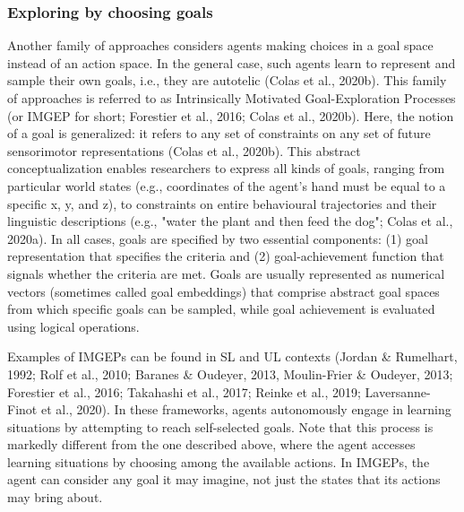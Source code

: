\subsubsection{Exploring by choosing goals}
Another family of approaches considers agents making choices in a goal space instead of an action space. In the general case, such agents learn to represent and sample their own goals, i.e., they are autotelic (Colas et al., 2020b). This family of approaches is referred to as Intrinsically Motivated Goal-Exploration Processes (or IMGEP for short; Forestier et al., 2016; Colas et al., 2020b). Here, the notion of a goal is generalized: it refers to any set of constraints on any set of future sensorimotor representations (Colas et al., 2020b). This abstract conceptualization enables researchers to express all kinds of goals, ranging from particular world states (e.g., coordinates of the agent’s hand must be equal to a specific x, y, and z), to constraints on entire behavioural trajectories and their linguistic descriptions (e.g., "water the plant and then feed the dog"; Colas et al., 2020a). In all cases, goals are specified by two essential components: (1) goal representation that specifies the criteria and (2) goal-achievement function that signals whether the criteria are met. Goals are usually represented as numerical vectors (sometimes called goal embeddings) that comprise abstract goal spaces from which specific goals can be sampled, while goal achievement is evaluated using logical operations.

Examples of IMGEPs can be found in SL and UL contexts (Jordan \& Rumelhart, 1992; Rolf et al., 2010; Baranes \& Oudeyer, 2013, Moulin-Frier \& Oudeyer, 2013; Forestier et al., 2016; Takahashi et al., 2017; Reinke et al., 2019; Laversanne-Finot et al., 2020). In these frameworks, agents autonomously engage in learning situations by attempting to reach self-selected goals. Note that this process is markedly different from the one described above, where the agent accesses learning situations by choosing among the available actions. In IMGEPs, the agent can consider any goal it may imagine, not just the states that its actions may bring about.

